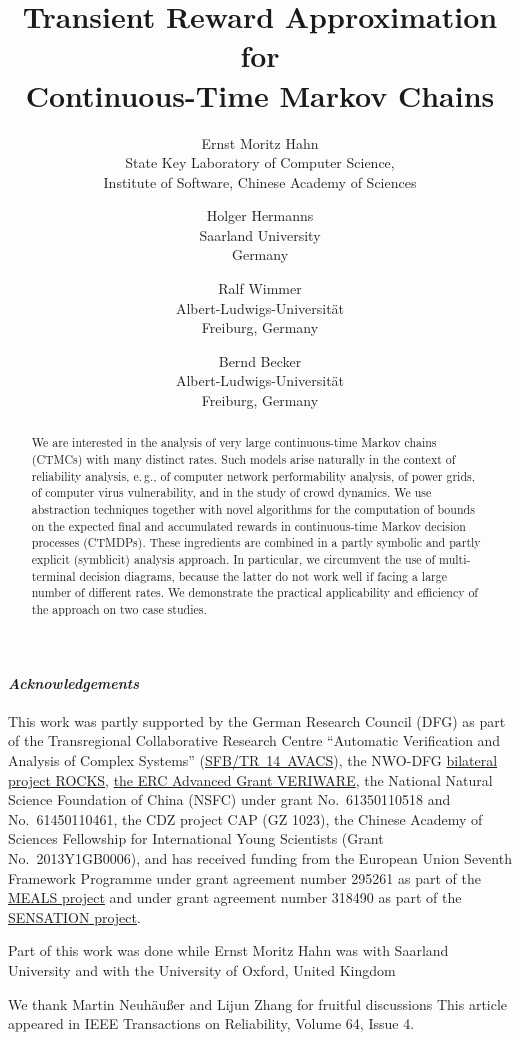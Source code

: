 \documentclass[10pt,twocolumn]{article}
\title{Transient Reward Approximation for\\ Continuous-Time Markov Chains}
\author{Ernst Moritz Hahn\\
  State Key Laboratory of Computer Science,\\
  Institute of Software, Chinese Academy of Sciences\\
  \and
  Holger Hermanns\\
  Saarland University\\
  Germany
  \and
  Ralf Wimmer\\
  Albert-Ludwigs-Universit\"at\\
  Freiburg, Germany
  \and
  Bernd Becker\\
  Albert-Ludwigs-Universit\"at\\
  Freiburg, Germany
}
\date{}
\begin{document}
\maketitle

\begin{abstract}
  \noindent We are interested in the analysis of very large continuous-time
  Markov chains (CTMCs) with many distinct rates. Such models arise
  naturally in the context of reliability analysis, e.\,g.,
  of computer network performability analysis, of power grids,
  of computer virus vulnerability, and in the study of
  crowd dynamics. We use abstraction techniques together with novel
  algorithms for the computation of bounds on the expected final and
  accumulated rewards in continuous-time Markov decision processes
  (CTMDPs). These ingredients are combined in a partly symbolic and
  partly explicit (symblicit) analysis approach. In particular, we
  circumvent the use of multi-terminal decision diagrams, because the
  latter do not work well if facing a large number of different
  rates. We demonstrate the practical applicability and efficiency of
  the approach on two case studies.
    \vspace{-1.6mm}
\end{abstract}

{\footnotesize
\paragraph*{\itshape Acknowledgements}
This work was partly supported by the German Research
Council (DFG) as part of the Transregional Collaborative
Research Centre ``Automatic Verification and Analysis of Complex
Systems'' (\href{www.avacs.org}{SFB/TR~14~AVACS}), the NWO-DFG \href{http://rocks.w3.rz.unibw-muenchen.de/}{bilateral project ROCKS},
\href{http://www.veriware.org/}{the ERC Advanced Grant VERIWARE},
the National Natural Science Foundation of China (NSFC) under grant No.\  61350110518 and No.\ 61450110461,
the CDZ project CAP (GZ 1023),
the Chinese Academy of Sciences Fellowship for International Young Scientists (Grant No.\ 2013Y1GB0006),
and has received funding from the European Union Seventh Framework Programme under 
grant agreement number 295261 as part of the
\href{http://www.meals-project.eu/}{MEALS project} and  under
grant agreement number 318490 as part of the
\href{http://www.sensation-project.eu/}{SENSATION project}.

Part of this work was done while Ernst Moritz Hahn was with Saarland University and with the University of Oxford, United Kingdom

We thank Martin Neuh{\"a}u{\ss}er and Lijun Zhang for fruitful discussions
This article appeared in IEEE Transactions on Reliability, Volume 64, Issue 4.
}
\end{document}
